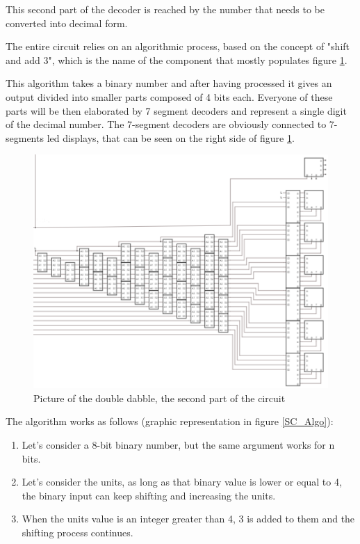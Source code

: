 \documentclass{article}
\begin{document}
This second part of the decoder is reached by the number that needs to be converted into decimal form. 

\vspace{3mm}

The entire circuit relies on an algorithmic process, based on the concept of "shift and add 3", which is the name of the component that mostly populates figure \ref{DoubleDabble}.

\vspace{3mm}

This algorithm takes a binary number and after having processed it gives an output divided into smaller parts composed of 4 bits each. Everyone of these parts will be then elaborated by 7 segment decoders and represent a single digit of the decimal number. The 7-segment decoders are obviously connected to 7-segments led displays, that can be seen on the right side of figure \ref{DoubleDabble}.

\begin{figure}[h]
    \centering
    \includegraphics[scale=0.43]{SC_DoubleDabble}
    \caption{Picture of the double dabble, the second part of the circuit}
    \label{DoubleDabble}
  \end{figure}


The algorithm works as follows (graphic representation in figure \ref{SC_Algo}):
\begin{enumerate}
  \item Let's consider a 8-bit binary number, but the same argument works for n bits. 
  \item Let's consider the units, as long as that binary value is lower or equal to 4, the binary input can keep shifting and increasing the units.
  \item When the units value is an integer greater than 4, 3 is added to them and the shifting process continues.
\end{enumerate}
\end{document}
